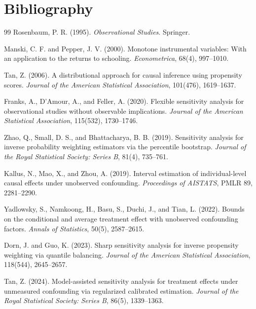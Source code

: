 \documentclass[11pt]{article}
\theoremstyle{definition}
\theoremstyle{plain}
\theoremstyle{remark}
\begin{document}
\section*{Bibliography}
\begin{thebibliography}{99}
Rosenbaum, P. R. (1995).
\newblock \emph{Observational Studies}.
\newblock Springer.

Manski, C. F. and Pepper, J. V. (2000).
\newblock Monotone instrumental variables: With an application to the returns to schooling.
\newblock \emph{Econometrica}, 68(4), 997--1010.

Tan, Z. (2006).
\newblock A distributional approach for causal inference using propensity scores.
\newblock \emph{Journal of the American Statistical Association}, 101(476), 1619--1637.

Franks, A., D'Amour, A., and Feller, A. (2020).
\newblock Flexible sensitivity analysis for observational studies without observable implications.
\newblock \emph{Journal of the American Statistical Association}, 115(532), 1730--1746.

Zhao, Q., Small, D. S., and Bhattacharya, B. B. (2019).
\newblock Sensitivity analysis for inverse probability weighting estimators via the percentile bootstrap.
\newblock \emph{Journal of the Royal Statistical Society: Series B}, 81(4), 735--761.

Kallus, N., Mao, X., and Zhou, A. (2019).
\newblock Interval estimation of individual-level causal effects under unobserved confounding.
\newblock \emph{Proceedings of AISTATS}, PMLR 89, 2281--2290.

Yadlowsky, S., Namkoong, H., Basu, S., Duchi, J., and Tian, L. (2022).
\newblock Bounds on the conditional and average treatment effect with unobserved confounding factors.
\newblock \emph{Annals of Statistics}, 50(5), 2587--2615.

Dorn, J. and Guo, K. (2023).
\newblock Sharp sensitivity analysis for inverse propensity weighting via quantile balancing.
\newblock \emph{Journal of the American Statistical Association}, 118(544), 2645--2657.

Tan, Z. (2024).
\newblock Model-assisted sensitivity analysis for treatment effects under unmeasured confounding via regularized calibrated estimation.
\newblock \emph{Journal of the Royal Statistical Society: Series B}, 86(5), 1339--1363.


\end{thebibliography}
\end{document}
